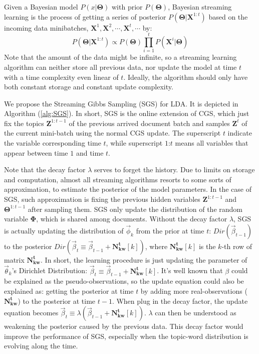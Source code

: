 \documentclass{article} %
\begin{document}
Given a Bayesian model $P(x|\bm{\Theta})$ with prior $P(\bm{\Theta})$, Bayesian streaming learning is the process of getting a series of posterior $P(\bm{\Theta}|\bm{X}^{1:t})$ based on the incoming data minibatches, $\bm{X}^1, \bm{X}^2, \cdots, \bm{X}^t, \cdots$ by:
$$P(\bm{\Theta}|\bm{X}^{1:t})\propto P(\bm{\Theta}) \prod_{i=1}^t P(\bm{X}^i|\bm{\Theta})$$
Note that the amount of the data might be infinite, so a streaming learning algorithm can neither store all previous data, nor update the model at time $t$ with a time complexity even linear of $t$. Ideally, the algorithm should only have both constant storage and constant update complexity.

We propose the Streaming Gibbs Sampling (SGS) for LDA. It is depicted in Algorithm (\ref{alg:SGS}). In short, SGS is the online extension of CGS, which just fix the topics $\bm{Z}^{1:t-1}$ of the previous arrived document batch and samples $\bm{Z}^t$ of the current mini-batch using the normal CGS update. The superscript $t$ indicate the variable corresponding time $t$, while superscript $1$:$t$ means all variables that appear between time $1$ and time $t$.

Note that the decay factor $\lambda$ serves to forget the history. Due to limits on storage and computation, almost all streaming algorithms resorts to some sorts of approximation, to estimate the posterior of the model parameters. In the case of SGS, such approximation is fixing the previous hidden variables $\bm{Z}^{1:t-1}$ and $\bm{\Theta}^{1:t-1}$ after sampling them. SGS only update the distribution of the random variable $\bm{\Phi}$, which is shared among documents. Without the decay factor $\lambda$, SGS is actually updating the distribution of $\vec{\phi}_k$ from the prior at time $t$: $Dir(\vec{\beta}_{t-1})$ to the posterior $Dir(\vec{\beta}_t\equiv\vec{\beta}_{t-1}+\bm{N_{kw}^t}[k])$, where $\bm{N_{kw}^t}[k]$ is the $k$-th row of matrix $\bm{N_{kw}^t}$. In short, the learning procedure is just updating the parameter of $\vec{\theta}_k$'s Dirichlet Distribution: $\vec{\beta}_t\equiv\vec{\beta}_{t-1}+\bm{N_{kw}^t}[k]$. It's well known that $\beta$ could be explained as the pseudo-observations, so the update equation could also be explained as: getting the posterior at time $t$ by adding more real-observations ($\bm{N_{kw}^t}$) to the posterior at time $t-1$. When plug in the decay factor, the update equation becomes $\vec{\beta}_t\equiv \lambda (\vec{\beta}_{t-1}+\bm{N_{kw}^t}[k])$. $\lambda$ can then be understood as weakening the posterior caused by the previous data. This decay factor would improve the performance of SGS, especially when the topic-word distribution is evolving along the time.
\end{document}
